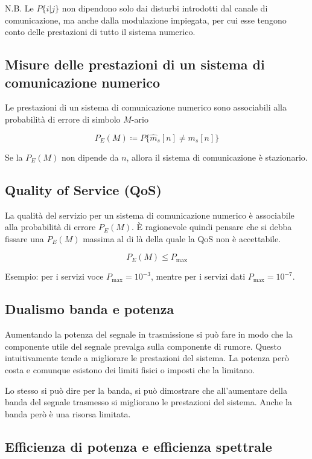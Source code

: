 N.B. Le $P\{i|j\}$ non dipendono solo dai disturbi introdotti dal canale di comunicazione, ma anche dalla modulazione impiegata, per cui esse tengono conto delle prestazioni di tutto il sistema numerico.

\subsection*{Misure delle prestazioni di un sistema di comunicazione numerico}

Le prestazioni di un sistema di comunicazione numerico sono associabili alla probabilità di errore di simbolo \(M\)-ario

\[
    P_E(M) \coloneqq P\{\hat{m}_s[n] \neq m_s[n]\}
\]

Se la \(P_E(M)\) non dipende da \(n\), allora il sistema di comunicazione è stazionario.

\subsection*{Quality of Service (QoS)}

La qualità del servizio per un sistema di comunicazione numerico è associabile alla probabilità di errore \(P_E(M)\). È ragionevole quindi pensare che si debba fissare una \(P_E(M)\) massima al di là della quale la QoS non è accettabile.

\[
    P_E(M) \leq P_{\text{max}}
\]

Esempio: per i servizi voce \(P_{\text{max}} = 10^{-3}\), mentre per i servizi dati \(P_{\text{max}} = 10^{-7}\).

\subsection*{Dualismo banda e potenza}

Aumentando la potenza del segnale in trasmissione si può fare in modo che la componente utile del segnale prevalga sulla componente di rumore. Questo intuitivamente tende a migliorare le prestazioni del sistema. La potenza però costa e comunque esistono dei limiti fisici o imposti che la limitano.

Lo stesso si può dire per la banda, si può dimostrare che all'aumentare della banda del segnale trasmesso si migliorano le prestazioni del sistema. Anche la banda però è una risorsa limitata.


\subsection*{Efficienza di potenza e efficienza spettrale}

